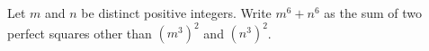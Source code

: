 Let $m$ and $n$ be distinct positive integers. Write $m^6+n^6$ as the sum of two perfect squares other than $(m^3)^2$ and $(n^3)^2$.
